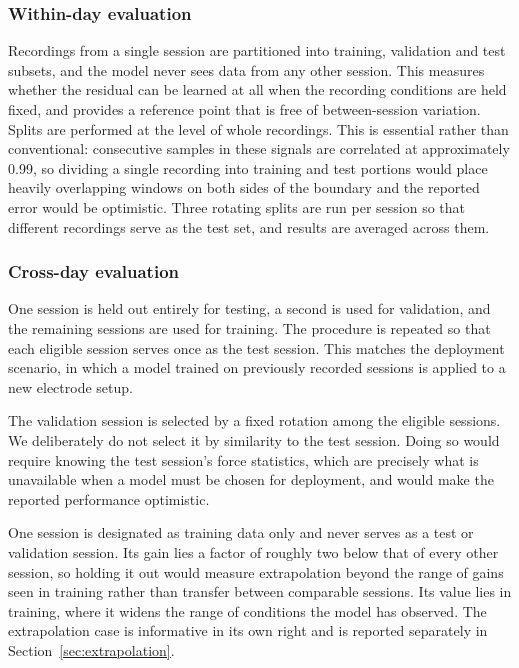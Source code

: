 \subsubsection{Within-day evaluation}

Recordings from a single session are partitioned into training, validation and
test subsets, and the model never sees data from any other session. This measures
whether the residual can be learned at all when the recording conditions are held
fixed, and provides a reference point that is free of between-session variation.
Splits are performed at the level of whole recordings. This is essential rather
than conventional: consecutive samples in these signals are correlated at
approximately 0.99, so dividing a single recording into training and test
portions would place heavily overlapping windows on both sides of the boundary
and the reported error would be optimistic. Three rotating splits are run per
session so that different recordings serve as the test set, and results are
averaged across them.

\subsubsection{Cross-day evaluation}

One session is held out entirely for testing, a second is used for validation,
and the remaining sessions are used for training. The procedure is repeated so
that each eligible session serves once as the test session. This matches the
deployment scenario, in which a model trained on previously recorded sessions is
applied to a new electrode setup.

The validation session is selected by a fixed rotation among the eligible
sessions. We deliberately do not select it by similarity to the test session.
Doing so would require knowing the test session's force statistics, which are
precisely what is unavailable when a model must be chosen for deployment, and
would make the reported performance optimistic.

One session is designated as training data only and never serves as a test or
validation session. Its gain lies a factor of roughly two below that of every
other session, so holding it out would measure extrapolation beyond the range of
gains seen in training rather than transfer between comparable sessions. Its
value lies in training, where it widens the range of conditions the model has
observed. The extrapolation case is informative in its own right and is reported
separately in Section~\ref{sec:extrapolation}.

